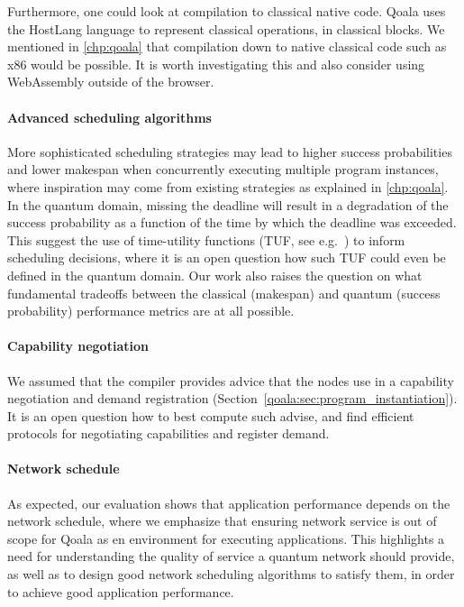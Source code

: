 Furthermore, one could look at compilation to classical native code.
Qoala uses the HostLang language to represent classical operations, in classical blocks.
We mentioned in \cref{chp:qoala} that compilation down to native classical code such as x86 would be possible.
It is worth investigating this and also consider using WebAssembly outside of the browser.

\paragraph{Advanced scheduling algorithms}
More sophisticated scheduling strategies may lead to higher success probabilities and lower makespan when concurrently executing multiple program instances, where inspiration may come from existing strategies as explained in \cref{chp:qoala}.
In the quantum domain, missing the deadline will result in a degradation of the success probability as a function of the time by which the deadline was exceeded.
This suggest the use of time-utility functions (TUF, see e.g.~\cite{jensen1993timeliness, li2004utility}) to inform scheduling decisions, where it is an open question how such TUF could even be defined in the quantum domain.
Our work also raises the question on what fundamental tradeoffs between the classical (makespan) and quantum (success probability) performance metrics are at all possible.


\paragraph{Capability negotiation}
We assumed that the compiler provides advice that the nodes use in a capability negotiation and demand registration (Section~\ref{qoala:sec:program_instantiation}).
It is an open question how to best compute such advise, and find efficient protocols for negotiating capabilities and register demand.

\paragraph{Network schedule}
As expected, our evaluation shows that application performance depends on the network schedule, where we emphasize that ensuring network service is out of scope for Qoala as en environment for executing applications.
This highlights a need for understanding the quality of service a quantum network should provide, as well as to design good network scheduling algorithms to satisfy them, in order to achieve good application performance.




\begin{xstretch}
\printbibliography[heading=subbibintoc,title={References},notcategory=noprint]
\end{xstretch}

